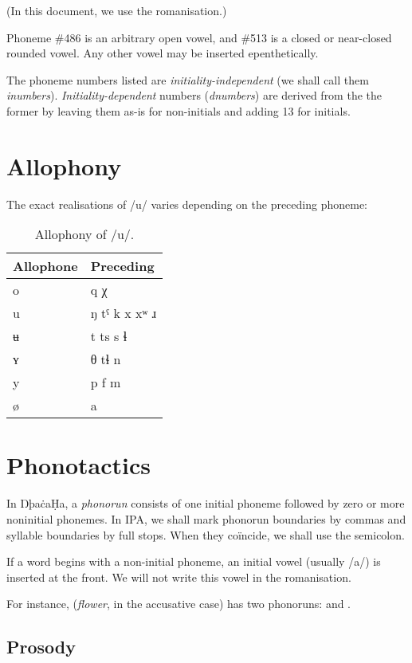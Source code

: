 \documentclass{book}
\newcommand{\lname}{ŊþaċaḤa}
\begin{document}
(In this document, we use the romanisation.)

Phoneme \#486 is an arbitrary open vowel, and \#513 is a closed or near-closed rounded vowel. Any other vowel may be inserted epenthetically.

The phoneme numbers listed are \emph{initiality-independent} (we shall call them \emph{inumbers}). \emph{Initiality-dependent} numbers (\emph{dnumbers}) are derived from the the former by leaving them as-is for non-initials and adding 13 for initials.

\section{Allophony}

The exact realisations of /u/ varies depending on the preceding phoneme:

\begin{table}[ht]
  \caption{Allophony of /u/.}
  \centering
  \begin{tabu}{l|Y}
    Allophone & Preceding \\
    \hline
    o & q χ \\
    u & ŋ tˤ k x xʷ ɹ \\
    ʉ & t ts s ɬ \\
    ʏ & θ tɬ n \\
    y & p f m \\
    ø & a \\
  \end{tabu}
\end{table}

\section{Phonotactics}

In \lname, a \emph{phonorun} consists of one initial phoneme followed by zero or more noninitial phonemes. In IPA, we shall mark phonorun boundaries by commas and syllable boundaries by full stops. When they coïncide, we shall use the semicolon.

If a word begins with a non-initial phoneme, an initial vowel (usually /a/) is inserted at the front. We will not write this vowel in the romanisation.

For instance,  (\emph{flower}, in the accusative case) has two phonoruns:  and .

\subsection{Prosody}
\end{document}
